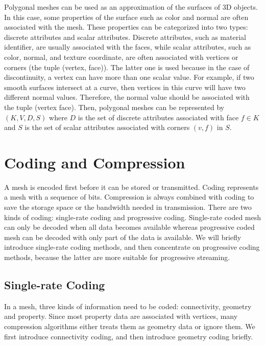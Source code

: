     Polygonal meshes can be used as an approximation of the surfaces
    of 3D objects. In this case, some properties of the surface such
    as color and normal are often associated with the mesh. These
    properties can be categorized into two types: discrete attributes
    and scalar attributes\label{property}. Discrete attributes, such
    as material identifier, are usually associated with the faces, while
    scalar attributes, such as color, normal, and texture coordinate,
    are often associated with vertices or corners (the tuple (vertex,
    face)). The latter one is used because in the case of
    discontinuity, a vertex can have more than one scalar value. For
    example, if two smooth surfaces intersect at a curve, then vertices
    in this curve will have two different normal values. Therefore,
    the normal value should be associated with the tuple (vertex face).
    Then, polygonal meshes can be represented by $(K, V, D, S)$ where
    $D$ is the set of discrete attributes associated with face $f \in
    K$ and $S$ is the set of scalar attributes associated with corners $(v, f)$ in $S$.

    \section{Coding and Compression}
    A mesh is encoded first before it can be stored or
    transmitted. Coding represents a mesh with a sequence of
    bits. Compression is always combined with coding to save the storage space
    or the bandwidth needed in transmission. 
    There are two kinds of coding:
    single-rate coding and progressive coding. 
    Single-rate coded mesh can only be decoded when all data becomes available 
    whereas progressive coded mesh can be decoded with only part of the data is available. 
    We will briefly introduce single-rate coding methods, and then concentrate on
    progressive coding methods, because the latter are more suitable for progressive streaming.
    
    \subsection{Single-rate Coding} \label{single_rate}
    In a mesh, three kinds of information need to be coded:
    connectivity, geometry and property. 
    Since most property data are associated with vertices, 
    many compression algorithms either treats them as geometry data or 
    ignore them. We first introduce connectivity coding, 
    and then introduce geometry coding briefly.
    

